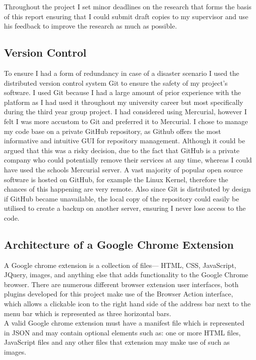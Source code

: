 \documentclass[12pt]{article}
\begin{document}
Throughout the project I set minor deadlines on the research that forms the basis of this report ensuring that I could submit draft copies to my supervisor and use his feedback to improve the research as much as possible. 

\subsection{Version Control}
To ensure I had a form of redundancy in case of a disaster scenario I used the distributed version control system Git to ensure the safety of my project's software. I used Git because I had a large amount of prior experience with the platform as I had used it throughout my university career but most specifically during the third year group project. I had considered using Mercurial, however I felt I was more accustom to Git and preferred it to Mercurial. I chose to manage my code base on a private GitHub repository, as Github offers the most informative and intuitive GUI for repository management. Although it could be argued that this was a risky decision, due to the fact that GitHub is a private company who could potentially remove their services at any time, whereas I could have used the schools Mercurial server. A vast majority of popular open source software is hosted on GitHub, for example the Linux Kernel, therefore the chances of this happening are very remote.  Also since Git is distributed by design if GitHub became unavailable, the local copy of the repository could easily be utilised to create a backup on another server, ensuring I never lose access to the code.

\subsection{Architecture of a Google Chrome Extension}
A Google chrome extension is a collection of files— HTML, CSS, JavaScript, JQuery, images, and anything else that adds functionality to the Google Chrome browser. There are numerous different browser extension user interfaces, both plugins developed for this project make use of the Browser Action interface, which allows a clickable icon to the right hand side of the address bar next to the menu bar which is represented as three horizontal bars. \\

A valid Google chrome extension must have a manifest file which is represented in JSON and may contain optional elements such as: one or more HTML files, JavaScript files and any other files that extension may make use of such as images. \\
\end{document}
